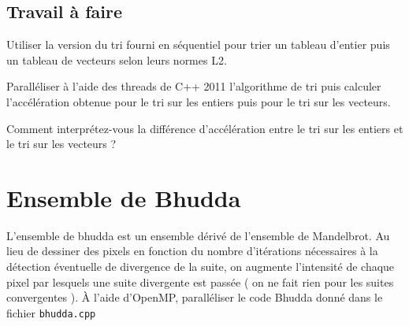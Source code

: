 \documentclass[11pt,a4paper]{article}
\begin{document}
\subsection{Travail à faire}

Utiliser la version du tri fourni en séquentiel pour trier un tableau d'entier
puis un tableau de vecteurs selon leurs normes L2.

Paralléliser à l'aide des threads de C++ 2011 l'algorithme de tri puis calculer
l'accélération obtenue pour le tri sur les entiers puis pour le tri sur les vecteurs.

Comment interprétez-vous la différence d'accélération entre le tri sur les entiers et
le tri  sur les vecteurs ?

\section{Ensemble de Bhudda}

L'ensemble de bhudda est un ensemble dérivé de l'ensemble de Mandelbrot. Au lieu de dessiner des pixels en fonction
du nombre d'itérations nécessaires à la détection éventuelle de divergence de la suite, on augmente l'intensité de chaque
pixel par lesquels une suite divergente est passée ( on ne fait rien pour les suites convergentes ).
\`A l'aide d'OpenMP, paralléliser le code Bhudda donné dans le fichier \texttt{bhudda.cpp}
\end{document}
